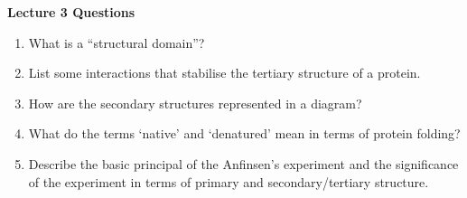 \vfill
\begin{center}
\textbf{Lecture 3 Questions}
\end{center}

\begin{enumerate}

\item What is a ``structural domain''?


\item List some interactions that stabilise the tertiary structure of a protein.


\item How are the secondary structures represented in a diagram?


\item What do the terms `native' and `denatured' mean in terms of protein folding?


\item Describe the basic principal of the Anfinsen's experiment and the significance of the experiment in terms of primary and secondary/tertiary structure.



\end{enumerate}
